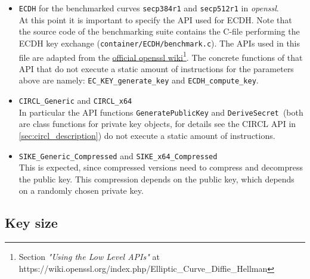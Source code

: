 \begin{itemize}
\item \texttt{\gls{ECDH}} for the benchmarked curves \texttt{secp384r1} and \texttt{secp512r1} in \textit{\gls{openssl}}.\\
At this point it is important to specify the API used for \gls{ECDH}. Note that the source code of the benchmarking suite contains the C-file performing the \gls{ECDH} key exchange (\texttt{container/ECDH/benchmark.c}). The APIs used in this file are adapted from the \href{https://wiki.openssl.org/index.php/Elliptic\_Curve\_Diffie\_Hellman}{official \gls{openssl} wiki}\footnote{Section \textit{"Using the Low Level APIs"} at https://wiki.openssl.org/index.php/Elliptic\_Curve\_Diffie\_Hellman}. The concrete functions of that API that do not execute a static amount of instructions for the parameters above are namely: \texttt{EC\_KEY\_generate\_key} and \texttt{ECDH\_compute\_key}.
\item \texttt{\gls{CIRCL}\_Generic} and \texttt{\gls{CIRCL}\_x64}\\
In particular the API functions \texttt{GeneratePublicKey} and \texttt{DeriveSecret }(both are class functions for private key objects, for details see the \gls{CIRCL} API in \autoref{sec:circl_description}) do not execute a static amount of instructions.
\item \texttt{\gls{SIKE}\_Generic\_Compressed} and \texttt{\gls{SIKE}\_x64\_Compressed}\\
This is expected, since compressed versions need to compress and decompress the public key. This compression depends on the public key, which depends on a randomly chosen private key. 
\end{itemize}

\subsection{Key size}\label{sec:analysis_security_keys}

